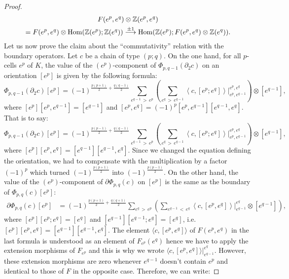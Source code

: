 \documentclass[10pt]{amsart}
\theoremstyle{definition}
\numberwithin{equation}{section}
\numberwithin{figure}{section}
\newcommand{\arr}{\buildrel{\pm 1}\over{\longrightarrow}}
\newcommand{\Z}{\mathbb{Z}}
\DeclareMathOperator{\Hom}{Hom}
\begin{document}
\begin{proof}
\begin{multline*}
F(e^p,e^q)\otimes \Z(e^p,e^q)\\
=
 F(e^p,e^q)\otimes \Hom(\Z(e^p);\Z(e^q))
\arr\Hom(\Z(e^p);F(e^p,e^q)\otimes\Z(e^q)).
\end{multline*}
Let us now prove the claim about the ``commutativity'' relation with the boundary operators. Let $c$ be a chain of type $(p;q)$. On the one hand, for all $p$-cells $e^p$ of $K$, the value of the $(e^p)$-component of $\Phi_{p,q-1}(\partial_2 c)$ on an orientation $[e^p]$ is given by the following formula:
\begin{equation*}
\Phi_{p,q-1}(\partial_2c)[e^p]=(-1)^{\frac{p(p+1)}{2}+\frac{q(q-1)}{2}}\sum_{e^{q-1}\,>\,e^p}\left(\sum_{e^q\,>\,e^{q-1}} \left\langle c, [e^p;e^q]\right\rangle \Big|^{e^p,e^q}_{e^p,e^{q-1}}\right)\otimes\left[e^{q-1}\right],
\end{equation*}
where $[e^p][e^p,e^{q-1}]=[e^{q-1}]$ and $[e^p,e^q]=(-1)^p[e^p,e^{q-1}][e^{q-1},e^q]$. That is to say:
\begin{equation*}
\Phi_{p,q-1}(\partial_2c)[e^p]=(-1)^{\frac{p(p-1)}{2}+\frac{q(q-1)}{2}}\sum_{e^{q-1}\,>\,e^p}\left(\sum_{e^q\,>\,e^{q-1}} \left\langle c, [e^p;e^q]\right\rangle \Big|^{e^p,e^q}_{e^p,e^{q-1}}\right)\otimes\left[e^{q-1}\right],
\end{equation*}
where $[e^p][e^p,e^q]=[e^{q-1}][e^{q-1},e^q]$. Since we changed the equation defining the orientation, we had to compensate with the multiplication by a factor $(-1)^p$ which turned $(-1)^{\frac{p(p+1)}{2}}$ into $(-1)^{\frac{p(p-1)}{2}}$. On the other hand, the value of the $(e^p)$-component of $\partial\Phi_{p,q}(c)$ on $[e^p]$ is the same as the boundary of $\Phi_{p,q}(c)[e^p]$:
\begin{align*}
\partial\Phi_{p,q}(c)[e^p] & =(-1)^{\frac{p(p+1)}{2}+\frac{q(q+1)}{2}} \sum_{e^q\,>\,e^p} \left(\sum_{e^{q-1}\,<\,e^q} \left\langle c,[e^p,e^q]\right\rangle \Big|^{e^q}_{e^{q-1}}\otimes\left[e^{q-1}\right] \right),
\end{align*}
where $[e^p][e^p;e^q]=[e^q]$ and $[e^{q-1}][e^{q-1};e^q]=[e^q]$, i.e. $[e^p][e^p,e^q]=[e^{q-1}][e^{q-1},e^q]$. The element $\langle c,[e^p,e^q]\rangle$ of $F(e^p,e^q)$ in the last formula is understood as an element of $F_{e^p}(e^q)$ hence we have to apply the extension morphisms of $F_{e^p}$ and this is why we wrote $\langle c,[e^p,e^q]\rangle |^{e^q}_{e^{q-1}}$. However, these extension morphisms are zero whenever $e^{q-1}$ doesn't contain $e^p$ and identical to those of $F$ in the opposite case. Therefore, we can write:

\end{proof}
\end{document}
